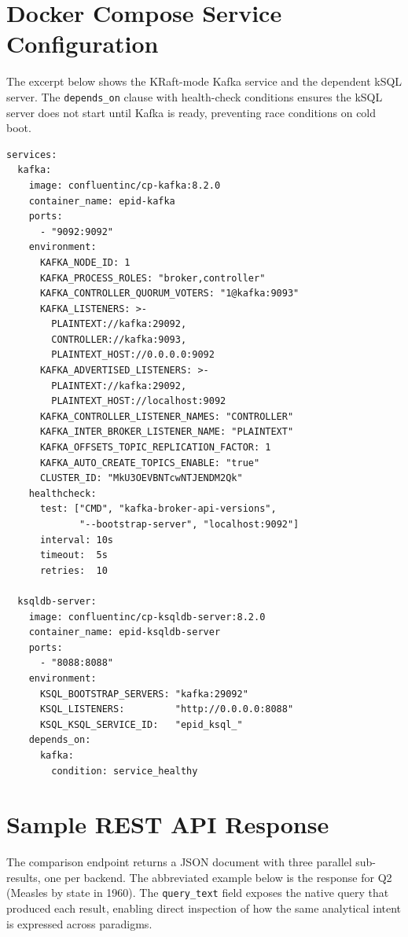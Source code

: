 \documentclass[12pt,a4paper]{article}
\begin{document}
\section{Docker Compose Service Configuration}
\label{app:docker}

The excerpt below shows the KRaft-mode Kafka service and the dependent kSQL server. The \texttt{depends\_on} clause with health-check conditions ensures the kSQL server does not start until Kafka is ready, preventing race conditions on cold boot.

\begin{lstlisting}[language={}, caption={Kafka KRaft and kSQL service definitions from \texttt{docker-compose.yml}.}]
services:
  kafka:
    image: confluentinc/cp-kafka:8.2.0
    container_name: epid-kafka
    ports:
      - "9092:9092"
    environment:
      KAFKA_NODE_ID: 1
      KAFKA_PROCESS_ROLES: "broker,controller"
      KAFKA_CONTROLLER_QUORUM_VOTERS: "1@kafka:9093"
      KAFKA_LISTENERS: >-
        PLAINTEXT://kafka:29092,
        CONTROLLER://kafka:9093,
        PLAINTEXT_HOST://0.0.0.0:9092
      KAFKA_ADVERTISED_LISTENERS: >-
        PLAINTEXT://kafka:29092,
        PLAINTEXT_HOST://localhost:9092
      KAFKA_CONTROLLER_LISTENER_NAMES: "CONTROLLER"
      KAFKA_INTER_BROKER_LISTENER_NAME: "PLAINTEXT"
      KAFKA_OFFSETS_TOPIC_REPLICATION_FACTOR: 1
      KAFKA_AUTO_CREATE_TOPICS_ENABLE: "true"
      CLUSTER_ID: "MkU3OEVBNTcwNTJENDM2Qk"
    healthcheck:
      test: ["CMD", "kafka-broker-api-versions",
             "--bootstrap-server", "localhost:9092"]
      interval: 10s
      timeout:  5s
      retries:  10

  ksqldb-server:
    image: confluentinc/cp-ksqldb-server:8.2.0
    container_name: epid-ksqldb-server
    ports:
      - "8088:8088"
    environment:
      KSQL_BOOTSTRAP_SERVERS: "kafka:29092"
      KSQL_LISTENERS:         "http://0.0.0.0:8088"
      KSQL_KSQL_SERVICE_ID:   "epid_ksql_"
    depends_on:
      kafka:
        condition: service_healthy
\end{lstlisting}


\section{Sample REST API Response}
\label{app:api}

The comparison endpoint returns a JSON document with three parallel sub-results, one per backend. The abbreviated example below is the response for Q2 (Measles by state in 1960). The \texttt{query\_text} field exposes the native query that produced each result, enabling direct inspection of how the same analytical intent is expressed across paradigms.
\end{document}
